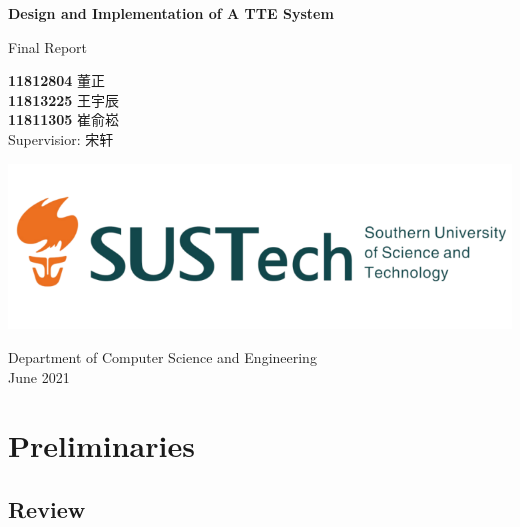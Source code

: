 \documentclass[fontset=none]{ctexart}
\theoremstyle{definition}
\theoremstyle{remark}
\begin{document}
\begin{titlepage}
    \begin{center}
        \vspace*{1cm}
            
        \Huge
        \textbf{Design and Implementation of A TTE System}
            
        \vspace{0.5cm}
        \LARGE
        Final Report\\
            
        \vspace{1.5cm}
            
        \textbf{11812804}  董\quad 正\\
        \textbf{11813225}  王宇辰\\
        \textbf{11811305}  崔俞崧\\

        \vspace{0.5cm}
        Supervisior: 宋轩
            
        \vfill
            
        \includegraphics[width=\textwidth]{images/sustc.png}
            
        \vspace{0.2cm}
            
        \Large
        Department of Computer Science and Engineering\\
        \vspace{0.5cm}
        June 2021
            
    \end{center}
\end{titlepage}

\tableofcontents

\clearpage
\section{Preliminaries}
\subsection{Review}
\end{document}
